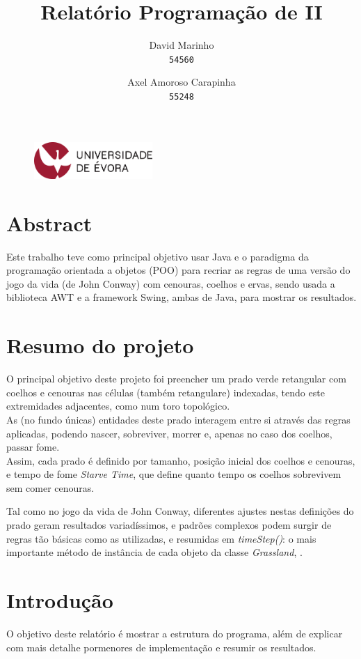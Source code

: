\documentclass {report}
\title {Relatório Programação de II}
\author{
  David Marinho\\
  \texttt{54560}
  \and
  Axel Amoroso Carapinha\\
  \texttt{55248}
}
\begin{document}
\date{}
\begin{figure}[t]
	\vspace {-2cm}
	\centering
	\includegraphics[width=0.4\textwidth]{uni_logo.png}
\end{figure}
\maketitle


\tableofcontents 
\newpage

\section*{Abstract}
Este trabalho teve como principal objetivo usar Java e o paradigma da programação orientada a objetos (POO) 
para recriar as regras de uma versão do jogo da vida (de John Conway) com cenouras, coelhos e ervas,
sendo usada a biblioteca AWT e a framework Swing, ambas de Java, para mostrar os resultados.

\section{Resumo do projeto}
O principal objetivo deste projeto foi preencher um prado verde retangular com coelhos e cenouras 
nas células (também retangulare) indexadas, tendo este extremidades adjacentes, como num toro topológico.\\

As (no fundo únicas) entidades deste prado interagem entre si através das regras aplicadas,
podendo nascer, sobreviver, morrer e, apenas no caso dos coelhos, passar fome.\\

Assim, cada prado é definido por tamanho, posição inicial dos coelhos e cenouras, e tempo de fome
\textit{Starve Time}, que define quanto tempo os coelhos sobrevivem sem comer cenouras.

Tal como no jogo da vida de John Conway, 
diferentes ajustes nestas definições do prado geram resultados variadíssimos,
e padrões complexos podem surgir de regras tão básicas como as utilizadas, 
e resumidas em \textit{timeStep()}: o mais importante método de instância de cada objeto da classe \textit{Grassland}, .

\section*{Introdução}
O objetivo deste relatório é mostrar a estrutura do programa, 
além de explicar com mais detalhe pormenores de implementação e resumir os resultados.\\
\end{document}
